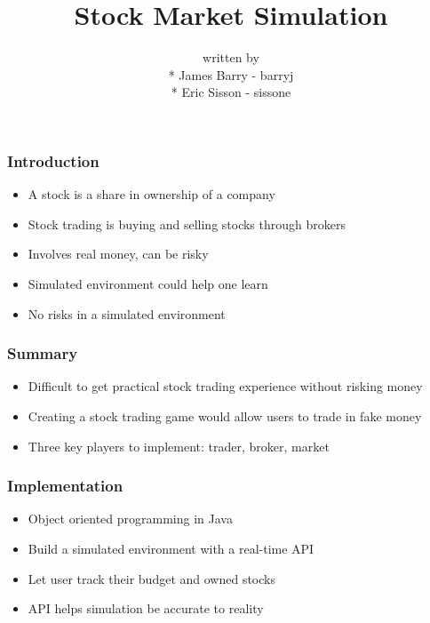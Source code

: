 \documentclass{beamer}
\title{Stock Market Simulation}
\author{written by \\* James Barry - barryj \\* Eric Sisson - sissone}
\begin{document}
\begin{frame}
\maketitle
\end{frame}

\begin{frame}
\frametitle{Introduction}
\begin{itemize}

\item{A stock is a share in ownership of a company}
\item{Stock trading is buying and selling stocks through brokers}
\item{Involves real money, can be risky}
\item{Simulated environment could help one learn}
\item{No risks in a simulated environment}

\end{itemize}

\end{frame}

\begin{frame}
\frametitle{Summary}
\begin{itemize}

\item{Difficult to get practical stock trading experience without risking money}
\item{Creating a stock trading game would allow users to trade in fake money}
\item{Three key players to implement: trader, broker, market}

\end{itemize}

\end{frame}

\begin{frame}
\frametitle{Implementation}
\begin{itemize}

\item{Object oriented programming in Java}
\item{Build a simulated environment with a real-time API}
\item{Let user track their budget and owned stocks}
\item{API helps simulation be accurate to reality}

\end{itemize}

\end{frame}
\end{document}
